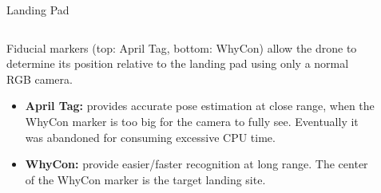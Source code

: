 \documentclass[final, 20pt]{beamer}
\newlength{\sepwidth}
\newlength{\colwidth}
\newcommand{\separatorcolumn}{\begin{column}{\sepwidth}\end{column}}
\begin{document}
\begin{frame}[t]
\begin{columns}[t]
\begin{column}{\colwidth}
  \begin{block}{Landing Pad}

    \vspace{0.5cm}
    \begin{columns}
      \begin{column}{0.65\textwidth}
        Fiducial markers (top: April Tag\cite{apriltag_paper}, bottom: WhyCon\cite{whycon_paper}) allow the drone to determine its position relative to the landing pad using only a normal RGB camera.

        \begin{itemize}
          \item \textbf{April Tag:} provides accurate pose estimation at close range, when the WhyCon marker is too big for the camera to fully see. Eventually it was abandoned for consuming excessive CPU time.
          \item \textbf{WhyCon:} provide easier/faster recognition at long range. The center of the WhyCon marker is the target landing site.
        \end{itemize}
      \end{column}
      \begin{column}{0.3\textwidth}
      \end{column}
    \end{columns}

  \end{block}

\end{column}

\separatorcolumn


\end{columns}
\end{frame}
\end{document}
